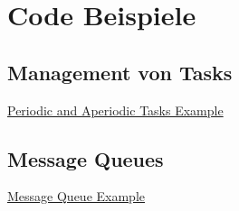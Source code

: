 \newpage
\onecolumn

\section{Code Beispiele}

\subsection{Management von Tasks} \label{sec:task_management}

\underline{Periodic and Aperiodic Tasks Example}


\subsection{Message Queues} \label{sec:message_queue}

\underline{Message Queue Example}

